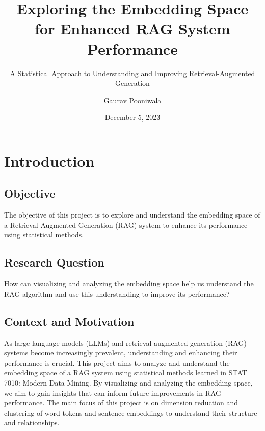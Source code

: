 \documentclass{scrartcl}
\begin{document}
\title{Exploring the Embedding Space for Enhanced RAG System Performance}
\subtitle{A Statistical Approach to Understanding and Improving Retrieval-Augmented Generation}
\author{Gaurav Pooniwala}
\date{December 5, 2023}

\maketitle

\section{Introduction}
\subsection{Objective}
The objective of this project is to explore and understand the embedding space of a Retrieval-Augmented Generation (RAG) system to enhance its performance using statistical methods.

\subsection{Research Question}
How can visualizing and analyzing the embedding space help us understand the RAG algorithm and use this understanding to improve its performance?

\subsection{Context and Motivation}
As large language models (LLMs) and retrieval-augmented generation (RAG) systems become increasingly prevalent, understanding and enhancing their performance is crucial. This project aims to analyze and understand the embedding space of a RAG system using statistical methods learned in STAT 7010: Modern Data Mining. By visualizing and analyzing the embedding space, we aim to gain insights that can inform future improvements in RAG performance. The main focus of this project is on dimension reduction and clustering of word tokens and sentence embeddings to understand their structure and relationships.
\end{document}
